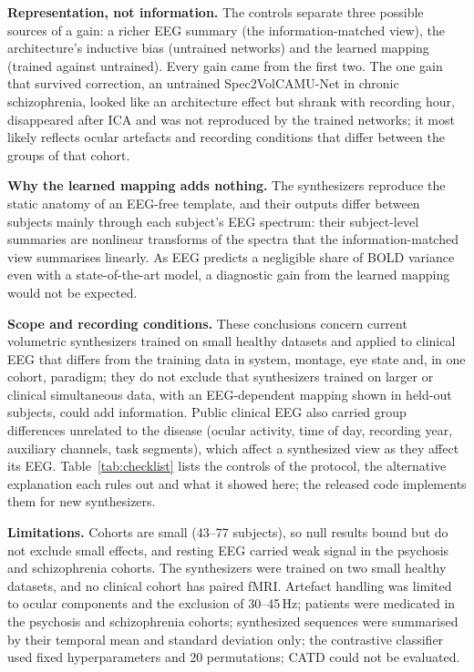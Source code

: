 \documentclass[pdflatex,referee,sn-basic]{sn-jnl}%
\begin{document}
\noindent\textbf{Representation, not information.} The controls separate three possible sources of a gain: a richer EEG summary (the information-matched view), the architecture's inductive bias (untrained networks) and the learned mapping (trained against untrained). Every gain came from the first two. The one gain that survived correction, an untrained Spec2VolCAMU-Net in chronic schizophrenia, looked like an architecture effect but shrank with recording hour, disappeared after ICA and was not reproduced by the trained networks; it most likely reflects ocular artefacts and recording conditions that differ between the groups of that cohort.

\noindent\textbf{Why the learned mapping adds nothing.} The synthesizers reproduce the static anatomy of an EEG-free template, and their outputs differ between subjects mainly through each subject's EEG spectrum: their subject-level summaries are nonlinear transforms of the spectra that the information-matched view summarises linearly. As EEG predicts a negligible share of BOLD variance even with a state-of-the-art model, a diagnostic gain from the learned mapping would not be expected.

\noindent\textbf{Scope and recording conditions.} These conclusions concern current volumetric synthesizers trained on small healthy datasets and applied to clinical EEG that differs from the training data in system, montage, eye state and, in one cohort, paradigm; they do not exclude that synthesizers trained on larger or clinical simultaneous data, with an EEG-dependent mapping shown in held-out subjects, could add information. Public clinical EEG also carried group differences unrelated to the disease (ocular activity, time of day, recording year, auxiliary channels, task segments), which affect a synthesized view as they affect its EEG. Table~\ref{tab:checklist} lists the controls of the protocol, the alternative explanation each rules out and what it showed here; the released code implements them for new synthesizers.

\noindent\textbf{Limitations.} Cohorts are small (43--77 subjects), so null results bound but do not exclude small effects, and resting EEG carried weak signal in the psychosis and schizophrenia cohorts. The synthesizers were trained on two small healthy datasets, and no clinical cohort has paired fMRI. Artefact handling was limited to ocular components and the exclusion of 30--45\,Hz; patients were medicated in the psychosis and schizophrenia cohorts; synthesized sequences were summarised by their temporal mean and standard deviation only; the contrastive classifier used fixed hyperparameters and 20 permutations; CATD could not be evaluated.
\end{document}
